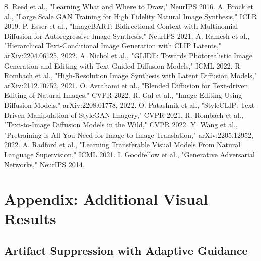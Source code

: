 \documentclass[10pt,twocolumn]{article}
\begin{document}
\begin{thebibliography}{99}
 S. Reed et al., "Learning What and Where to Draw," NeurIPS 2016.
 A. Brock et al., "Large Scale GAN Training for High Fidelity Natural Image Synthesis," ICLR 2019.
 P. Esser et al., "ImageBART: Bidirectional Context with Multinomial Diffusion for Autoregressive Image Synthesis," NeurIPS 2021.
 A. Ramesh et al., "Hierarchical Text-Conditional Image Generation with CLIP Latents," arXiv:2204.06125, 2022.
 A. Nichol et al., "GLIDE: Towards Photorealistic Image Generation and Editing with Text-Guided Diffusion Models," ICML 2022.
 R. Rombach et al., "High-Resolution Image Synthesis with Latent Diffusion Models," arXiv:2112.10752, 2021.
 O. Avrahami et al., "Blended Diffusion for Text-driven Editing of Natural Images," CVPR 2022.
 R. Gal et al., "Image Editing Using Diffusion Models," arXiv:2208.01778, 2022.
 O. Patashnik et al., "StyleCLIP: Text-Driven Manipulation of StyleGAN Imagery," CVPR 2021.
 R. Rombach et al., "Text-to-Image Diffusion Models in the Wild," CVPR 2022.
 Y. Wang et al., "Pretraining is All You Need for Image-to-Image Translation," arXiv:2205.12952, 2022.
 A. Radford et al., "Learning Transferable Visual Models From Natural Language Supervision," ICML 2021.
 I. Goodfellow et al., "Generative Adversarial Networks," NeurIPS 2014.
\end{thebibliography}
\onecolumn

\appendix

\section*{Appendix: Additional Visual Results}

\subsection*{Artifact Suppression with Adaptive Guidance}
\end{document}
